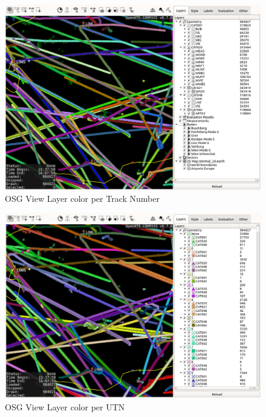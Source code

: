 \begin{figure}[H]
    \hspace*{-2.5cm}
    \includegraphics[width=19cm,frame]{figures/osgview_style_track_num.png}
  \caption{OSG View Layer color per Track Number}
\end{figure}

\begin{figure}[H]
    \hspace*{-2.5cm}
    \includegraphics[width=19cm,frame]{figures/osgview_style_utn.png}
  \caption{OSG View Layer color per UTN}
\end{figure}

